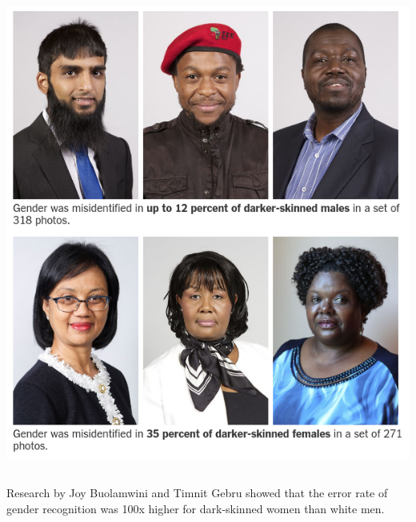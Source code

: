 \documentclass{beamer}
\begin{document}
\begin{frame}
\begin{columns}
    \begin{column}{0.4\textwidth}
        \includegraphics[width=1\textwidth]{./images/gender_race_2.png}
    \end{column}
\end{columns}
\small{Research by Joy Buolamwini and Timnit Gebru showed that the error rate of gender recognition was 100x higher for dark-skinned women than white men.}
\end{frame}

\end{document}
